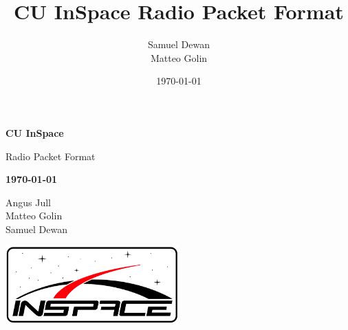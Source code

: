\documentclass[11pt,letterpaper]{article}
\title{CU InSpace Radio Packet Format}
\author{Samuel Dewan\\Matteo Golin}
\date{\today}
\begin{document}
\begin{titlepage}
    \centering

    {\large \textbf{CU InSpace}}

    {\Huge \sffamily Radio Packet Format}

    {\large \textbf{\today}}

    Angus Jull \\
    Matteo Golin \\
    Samuel Dewan

    \includegraphics[width=0.5\textwidth]{logo.png}
\end{titlepage}

\tableofcontents
\clearpage


\clearpage


\clearpage


\clearpage

\printbibliography
\end{document}
